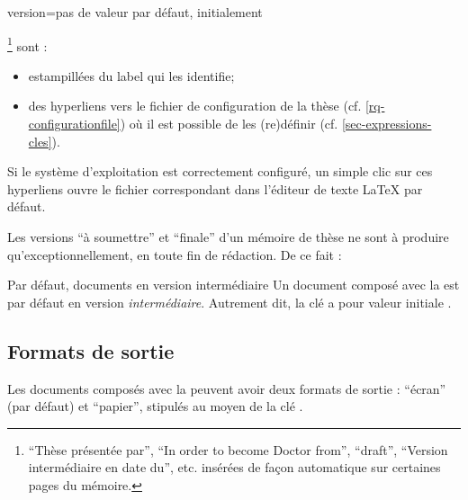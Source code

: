 {\begin{docKey}{version}{=\textbar{}\textbar{}\textbar{}\textbar{}\textbar{}}{pas
      de valeur par défaut, initialement }
\begin{description}
\begin{itemize}
\begin{enumerate}
\begin{enumerate}
            \yatCl\footnote{\enquote{Thèse présentée par},
              \foreignquote{english}{In order to become Doctor from},
              \foreignquote{english}{draft}, \enquote{Version intermédiaire en
                date du}, etc. insérées de façon automatique sur certaines pages
              du mémoire.} sont :
            \begin{itemize}
            \item estampillées du label qui les identifie;
            \item des hyperliens vers le fichier de configuration de la thèse
              (cf.  \vref{rq-configurationfile}) où il est possible de les
              (re)définir (cf. \vref{sec-expressions-cles}).
            \end{itemize}
          \end{enumerate}
          Si le système d'exploitation est correctement configuré, un simple
          clic sur ces hyperliens ouvre le fichier correspondant dans l'éditeur
          de texte \LaTeX{} par défaut.
        \end{enumerate}
      \end{itemize}
    \end{description}
  \end{docKey}
}

Les versions \enquote{à soumettre} et \enquote{finale} d'un mémoire de thèse ne
sont à produire qu'exceptionnellement, en toute fin de rédaction. De ce fait :
\begin{dbwarning}{Par défaut, documents en version intermédiaire}{}
  Un document composé avec la \yatCl{} est par défaut en version
  \emph{intermédiaire}. Autrement dit, la clé  a pour valeur
  initiale .
\end{dbwarning}

\subsection{Formats de sortie}
\label{sec-formats-de-sortie}
%

Les documents composés avec la \yatCl{} peuvent avoir deux formats de sortie :
\enquote{écran} (par défaut) et \enquote{papier}, stipulés au moyen de la clé
.

